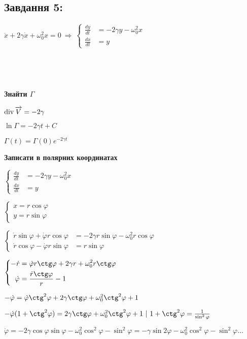 \subsection{Завдання 5:}

$\ddot{x} + 2\gamma\dot{x}+\omega_0^2x = 0 \ \Longrightarrow \ 
\left\{\begin{aligned}
    \frac{dy}{dt} &= -2\gamma y -\omega_0^2x\\
    \frac{dx}{dt} &= y 
\end{aligned}\right.$

\begin{figure}[h]
    \begin{minipage}[h]{0.49\linewidth}
         \\
    \end{minipage}
    \begin{minipage}[h]{0.49\linewidth}
         \\
    \end{minipage}
\end{figure}

\textbf{Знайти $\Gamma$}

$\operatorname*{div} \overrightarrow{V} = -2\gamma$

$\ln \Gamma = -2\gamma t + C$

$\Gamma(t) = \Gamma(0)e^{-2\gamma t}$

\textbf{Записати в полярних координатах}

$\left\{\begin{aligned}
    \frac{dy}{dt} &= -2\gamma y -\omega_0^2x\\
    \frac{dx}{dt} &= y 
\end{aligned}\right.$

$\left\{\begin{aligned}
    x = r\cos \varphi \\
    y = r\sin \varphi 
\end{aligned}\right.$

$\left\{\begin{aligned}
    \dot{r}\sin \varphi + \dot{\varphi}r \cos \varphi &=  -2\gamma r\sin \varphi - \omega_0^2 r\cos \varphi\\
    \dot{r}\cos \varphi - \dot{\varphi} r \sin \varphi &= r \sin \varphi
\end{aligned}\right.$

$\left\{\begin{aligned}
    -\dot{r} &= \dot{\varphi}r\ctg \varphi + 2\gamma r + \omega_0^2 r \ctg \varphi \\
    \dot{\varphi} &= \frac{\dot{r}\ctg \varphi }{r} - 1
\end{aligned}\right.$

$-\dot{\varphi} = \dot{\varphi} \ctg^2 \varphi + 2\gamma\ctg \varphi + \omega_0^2 \ctg^2 \varphi + 1$

$-\dot{\varphi}(1 + \ctg^2\varphi) =  2\gamma\ctg \varphi + \omega_0^2 \ctg^2\varphi + 1\ | \ 1+\ctg^2\varphi = \frac{1}{\sin^2\varphi}$ 

$\dot{\varphi} = -2\gamma\cos\varphi\sin\varphi - \omega^2_0\cos^2\varphi - \sin^2\varphi= 
-\gamma\sin 2\varphi - \omega_0^2\cos^2\varphi - \sin^2\varphi \ldots$